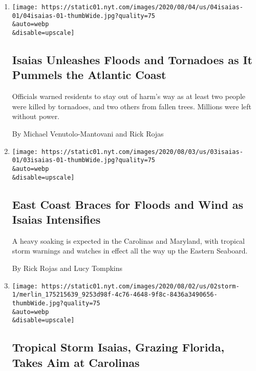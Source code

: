 \begin{enumerate}
\def\labelenumi{\arabic{enumi}.}
\item
  \href{/2020/08/04/us/hurricane-isaias-updates.html}{}

  \texttt{[image: https://static01.nyt.com/images/2020/08/04/us/04isaias-01/04isaias-01-thumbWide.jpg?quality=75\\\&auto=webp\\\&disable=upscale]}

  \hypertarget{isaias-unleashes-floods-and-tornadoes-as-it-pummels-the-atlantic-coast}{%
  \subsection{Isaias Unleashes Floods and Tornadoes as It Pummels the
  Atlantic
  Coast}\label{isaias-unleashes-floods-and-tornadoes-as-it-pummels-the-atlantic-coast}}

  Officials warned residents to stay out of harm's way as at least two
  people were killed by tornadoes, and two others from fallen trees.
  Millions were left without power.

  By Michael Venutolo-Mantovani and Rick Rojas
\item
  \href{/2020/08/03/us/isaias-east-coast-landfall.html}{}

  \texttt{[image: https://static01.nyt.com/images/2020/08/03/us/03isaias-01/03isaias-01-thumbWide.jpg?quality=75\\\&auto=webp\\\&disable=upscale]}

  \hypertarget{east-coast-braces-for-floods-and-wind-as-isaias-intensifies}{%
  \subsection{East Coast Braces for Floods and Wind as Isaias
  Intensifies}\label{east-coast-braces-for-floods-and-wind-as-isaias-intensifies}}

  A heavy soaking is expected in the Carolinas and Maryland, with
  tropical storm warnings and watches in effect all the way up the
  Eastern Seaboard.

  By Rick Rojas and Lucy Tompkins
\item
  \href{/2020/08/02/us/tropical-storm-isaias-florida-carolina.html}{}

  \texttt{[image: https://static01.nyt.com/images/2020/08/02/us/02storm-1/merlin\_175215639\_9253d98f-4c76-4648-9f8c-8436a3490656-thumbWide.jpg?quality=75\\\&auto=webp\\\&disable=upscale]}

  \hypertarget{tropical-storm-isaias-grazing-florida-takes-aim-at-carolinas}{%
  \subsection{Tropical Storm Isaias, Grazing Florida, Takes Aim at
  Carolinas}\label{tropical-storm-isaias-grazing-florida-takes-aim-at-carolinas}}


\end{enumerate}
